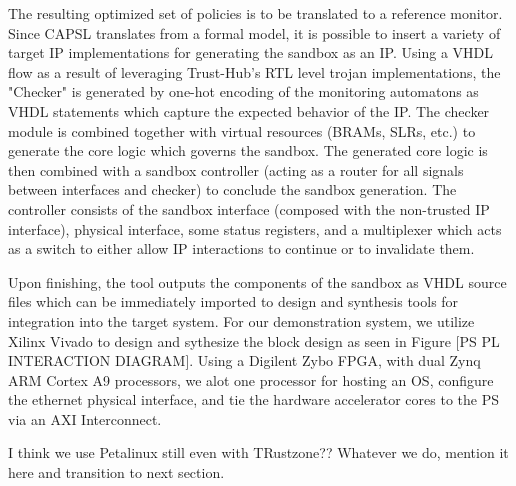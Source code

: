 \documentclass[sigconf]{acmart}
\theoremstyle{plain}
\theoremstyle{remark}
\begin{document}
The resulting optimized set of policies is to be translated to a reference monitor. Since CAPSL translates from a formal model, it is possible to insert a variety of target IP implementations for generating the sandbox as an IP. Using a VHDL flow as a result of leveraging Trust-Hub's RTL level trojan implementations, the "Checker" is generated by one-hot encoding of the monitoring automatons as VHDL statements which capture the expected behavior of the IP. The checker module is combined together with virtual resources (BRAMs, SLRs, etc.) to generate the core logic which governs the sandbox. The generated core logic is then combined with a sandbox controller (acting as a router for all signals between interfaces and checker) to conclude the sandbox generation. The controller consists of the sandbox interface (composed with the non-trusted IP interface), physical interface, some status registers, and a multiplexer which acts as a switch to either allow IP interactions to continue or to invalidate them.


Upon finishing, the tool outputs the components of the sandbox as VHDL source files which can be immediately imported to design and synthesis tools for integration into the target system. For our demonstration system, we utilize Xilinx Vivado to design and sythesize the block design as seen in Figure [PS PL INTERACTION DIAGRAM]. Using a Digilent Zybo FPGA, with dual Zynq ARM Cortex A9 processors, we alot one processor for hosting an OS, configure the ethernet physical interface, and tie the hardware accelerator cores to the PS via an AXI Interconnect.

I think we use Petalinux still even with TRustzone?? Whatever we do, mention it here and transition to next section.
\end{document}
